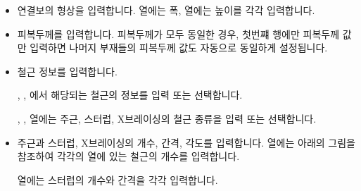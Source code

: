 \documentclass[a4paper,11pt,korean,openany,oneside]{sphinxmanual}
\begin{document}
\begin{itemize}
\begin{description}
\end{description}

\item {} \begin{description}
\sphinxAtStartPar
연결보의 형상을 입력합니다. 열에는 폭, 열에는 높이를 각각 입력합니다.

\end{description}

\item {} \begin{description}
\sphinxAtStartPar
피복두께를 입력합니다. 피복두께가 모두 동일한 경우, 첫번쨰 행에만 피복두께 값만 입력하면 나머지 부재들의 피복두께 값도 자동으로 동일하게 설정됩니다.

\end{description}

\item {} \begin{description}
\sphinxAtStartPar
철근 정보를 입력합니다.

\sphinxAtStartPar
{}, , 에서 해당되는 철근의 정보를 입력 또는 선택합니다.

\sphinxAtStartPar
{}, ,  열에는 주근, 스터럽, X\sphinxhyphen{}브레이싱의 철근 종류을 입력 또는 선택합니다.

\end{description}

\item {} \begin{description}
\sphinxAtStartPar
주근과 스터럽, X\sphinxhyphen{}브레이싱의 개수, 간격, 각도를 입력합니다.
 열에는 아래의 그림을 참조하여 각각의 열에 있는 철근의 개수를 입력합니다.

\begin{figure}[htbp]
\centering

\noindent{}
\end{figure}

\sphinxAtStartPar
{} 열에는 스터럽의 개수와 간격을 각각 입력합니다.


\end{description}
\end{itemize}
\end{document}
